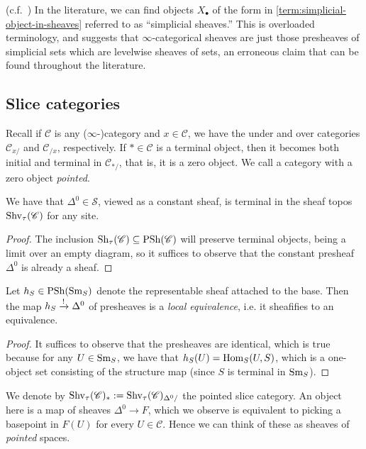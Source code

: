 \documentclass[11pt,openany]{book}
\begin{document}
\begin{warning} (c.f.~\cite[7.1.3.1]{HTT}) In the literature, we can find objects $X_\bullet$ of the form in \autoref{term:simplicial-object-in-sheaves} referred to as ``simplicial sheaves.'' This is overloaded terminology, and suggests that $\infty$-categorical sheaves are just those presheaves of simplicial sets which are levelwise sheaves of sets, an erroneous claim that can be found throughout the literature.
\end{warning}

\subsection{Slice categories}

Recall if $\mathscr{C}$ is any ($\infty$-)category and $x\in \mathscr{C}$, we have the under and over categories $\mathscr{C}_{x/}$ and $\mathscr{C}_{/x}$, respectively. If $\ast\in \mathscr{C}$ is a terminal object, then it becomes both initial and terminal in $\mathscr{C}_{\ast/}$, that is, it is a zero object. We call a category with a zero object \textit{pointed}.

\begin{proposition} We have that $\Delta^0 \in \mathcal{S}$, viewed as a constant sheaf, is terminal in the sheaf topos $\mathrm{Shv}_\tau(\mathscr{C})$ for any site.
\end{proposition}
\begin{proof}
The inclusion $\mathrm{Sh}_\tau(\mathscr{C}) \subseteq \mathrm{PSh}(\mathscr{C})$ will preserve terminal objects, being a limit over an empty diagram, so it suffices to observe that the constant presheaf $\Delta^0$ is already a sheaf.
\end{proof}

\begin{proposition}\label{prop:terminal-object-sheaves} 
Let $h_S \in \mathrm{PSh}(\mathrm{Sm}_S)$ denote the representable sheaf attached to the base. Then the map $h_S \xrightarrow{!} \Delta^0$ of presheaves is a \emph{local equivalence}, i.e. it sheafifies to an equivalence.
\end{proposition}
\begin{proof} It suffices to observe that the presheaves are identical, which is true because for any $U\in \mathrm{Sm}_S$, we have that $h_S(U) = \mathrm{Hom}_S(U,S)$, which is a one-object set consisting of the structure map (since $S$ is terminal in $\mathrm{Sm}_S$).
\end{proof}

\begin{notation} We denote by $\mathrm{Shv}_\tau(\mathscr{C})_\ast := \mathrm{Shv}_\tau(\mathscr{C})_{\Delta^0/}$ the pointed slice category. An object here is a map of sheaves $\Delta^0 \to F$, which we observe is equivalent to picking a basepoint in $F(U)$ for every $U \in \mathscr{C}$. Hence we can think of these as sheaves of \textit{pointed} spaces.
\end{notation}
\end{document}
